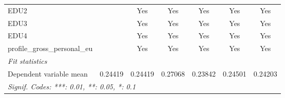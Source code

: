 \begin{tabular}{lcccccc}
   EDU2                                      &         & Yes          & Yes          & Yes          & Yes         & Yes\\  
   EDU3                                      &         & Yes          & Yes          & Yes          & Yes         & Yes\\  
   EDU4                                      &         & Yes          & Yes          & Yes          & Yes         & Yes\\  
   profile\_gross\_personal\_eu              &         & Yes          & Yes          & Yes          & Yes         & Yes\\  
   \midrule
   \emph{Fit statistics}\\
   Dependent variable mean                   & 0.24419 & 0.24419      & 0.27068      & 0.23842      & 0.24501     & 0.24203\\  
   \midrule \midrule
   \multicolumn{7}{l}{\emph{Signif. Codes: ***: 0.01, **: 0.05, *: 0.1}}\\
\end{tabular}
\par\endgroup


